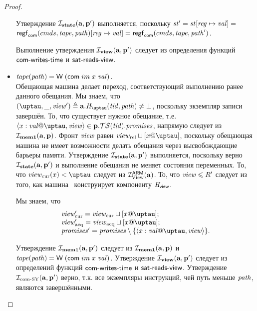 \begin{proof}
\begin{itemize}
  Утверждение $\mathcal{I}_{\rm \bf state}(\mathbf{a}, \mathbf{p}')$ выполняется, поскольку
  $\mathit{st}' = \mathit{st}[\mathit{reg} \mapsto \mathit{val}] =$
  $\mathsf{regf}_\mathsf{com}({cmds}, \mathit{tape}, \mathit{path})[\mathit{reg} \mapsto \mathit{val}] = \mathsf{regf}_\mathsf{com}({cmds}, \mathit{tape}, \mathit{path}')$.
  
  Выполнение утверждения $\mathcal{I}_{\rm \bf view} (\mathbf{a}, \mathbf{p}')$ следует из определения функций $\textsf{com-writes-time}$ и $\textsf{sat-reads-view}$.

  \item $\mathit{tape}(\mathit{path}) = \textsf{W} \; (\mathsf{com} \; im \; x \; \mathit{val})$. \\
    Обещающая машина делает переход, соответствующий выполнению ранее данного обещания.
    Мы знаем, что $(\tau, \_, \R') \triangleq \aT.\tmap(\tId, \cpath) \not = \bot$,
    поскольку экземпляр записи завершён.
    То, что существует нужное обещание, т.е. $\writeEvt{x}{\stval}{\tau}{\R} \in \p.\TSfprom(\tId).\PromSet$,
    напрямую следует из $\mathcal{I}_{\rm \bf mem1}(\mathbf{a}, \mathbf{p})$.
    Фронт $\mathit{view}$ равен $\Rrel \sqcup [x@\tau]$, поскольку обещающая машина не имеет возможности
    делать обещания через высвобождающие барьеры памяти.
    Утверждение $\mathcal{I}_{\rm \bf state}(\mathbf{a}, \mathbf{p}')$ выполняется, поскольку верно $\mathcal{I}_{\rm \bf state}(\mathbf{a}, \mathbf{p}')$ и выполнение обещания
    не меняет состояния переменных.
    То, что $\Rcur(x) < \tau$ следует из $\mathcal{I}^\mathsf{ARM}_{\textup{\rm {View}}}(\mathbf{a})$.
    То, что $\mathit{view} \leqslant R'$ следует из того, как машина \ARMt~конструирует компоненту $\mathit{H}_{\mathsf{view}}$.

    Мы знаем, что 
    \[\begin{array}{l}
\Rcur' = \Rcur \sqcup [x@\tau];\\
\Racq' = \Racq \sqcup [x@\tau];\\
\PromSet' = \PromSet \setminus \{ \writeEvt{x}{\stval}{\tau}{\R} \}.\\
    \end{array}\]

    Утверждение $\mathcal{I}_{\rm \bf mem1}(\mathbf{a}, \mathbf{p}')$ следует из $\mathcal{I}_{\rm \bf mem1}(\mathbf{a}, \mathbf{p})$ и
    $\mathit{tape}(\mathit{path}) = \textsf{W} \; (\mathsf{com} \; im \; x \; \mathit{val})$.
    Утверждение $\mathcal{I}_{\rm \bf view} (\mathbf{a}, \mathbf{p}')$ следует из определений функций $\textsf{com-writes-time}$ и $\textsf{sat-reads-view}$.
    Утверждение $\mathcal{I}_{\textup{\rm com-SY}}(\mathbf{a}, \mathbf{p}')$ верно, т.к. все экземпляры инструкций, чей путь меньше $\mathit{path}$,
    являются завершёнными.
  \end{itemize}

\end{proof}

